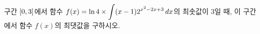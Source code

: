 구간 $[0{,}\mkern3mu\mathopen{}3]$에서 함수 $f(x)=\ln 4\times\displaystyle\int(x-1)2^{x^2-2x+3}\mkern3mu dx$의 최솟값이 $3$일 때, 이 구간에서 함수 $f(x)$의 최댓값을 \mbox{구하시오.}
